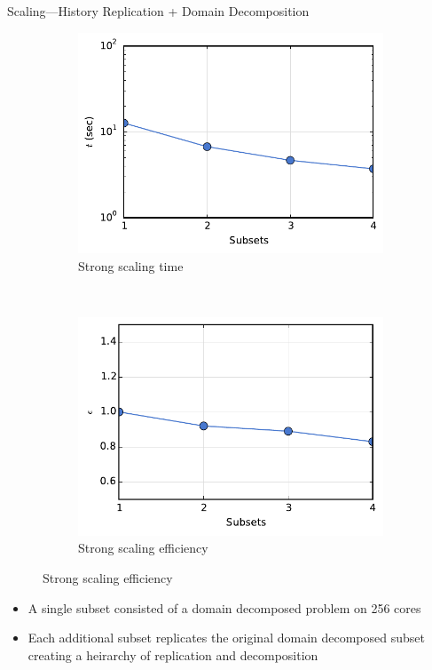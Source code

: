 \documentclass{beamer}
\begin{document}
\begin{frame}{Scaling---History Replication + Domain Decomposition}

  \vspace{-0.3in}

  \begin{figure}
    \centering
    \begin{subfigure}{0.4\textwidth}
      \centering
      \includegraphics[width=\textwidth]{strong_rep_time}
      \caption{Strong scaling time}
    \end{subfigure}
    ~
    \begin{subfigure}{0.4\textwidth}
      \centering
      \includegraphics[width=\textwidth]{strong_rep_eff}
      \caption{Strong scaling efficiency}
    \end{subfigure}
  \end{figure}

  \vfill
  \begin{itemize}
  \item A single subset consisted of a domain decomposed problem on 256 cores
  \item Each additional subset replicates the original domain decomposed
    subset creating a heirarchy of replication and decomposition
  \end{itemize}

\end{frame}
\end{document}
